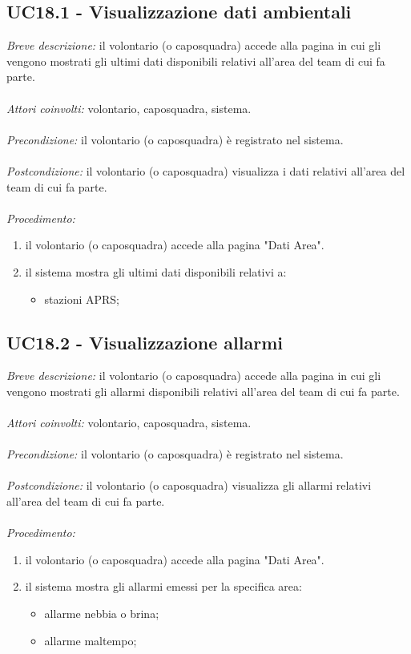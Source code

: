 \subsection{UC18.1 - Visualizzazione dati ambientali}
\textit{Breve descrizione:} il volontario (o caposquadra) accede alla pagina in cui gli vengono mostrati gli ultimi dati disponibili relativi all'area del team di cui fa parte. 
\\
\\
\textit{Attori coinvolti:} volontario, caposquadra, sistema.
\\
\\
\textit{Precondizione:} il volontario (o caposquadra) è registrato nel sistema.
\\
\\
\textit{Postcondizione:} il volontario (o caposquadra) visualizza i dati relativi all'area del team di cui fa parte.
\\
\\
\textit{Procedimento:}
\begin{enumerate}
	\item il volontario (o caposquadra) accede alla pagina "Dati Area".
	\item il sistema mostra gli ultimi dati disponibili relativi a:
	\begin{itemize}
		\item stazioni APRS;
	\end{itemize}
\end{enumerate}

\subsection{UC18.2 - Visualizzazione allarmi}
\textit{Breve descrizione:} il volontario (o caposquadra) accede alla pagina in cui gli vengono mostrati gli allarmi disponibili relativi all'area del team di cui fa parte. 
\\
\\
\textit{Attori coinvolti:} volontario, caposquadra, sistema.
\\
\\
\textit{Precondizione:} il volontario (o caposquadra) è registrato nel sistema.
\\
\\
\textit{Postcondizione:} il volontario (o caposquadra) visualizza gli allarmi relativi all'area del team di cui fa parte.
\\
\\
\textit{Procedimento:}
\begin{enumerate}
	\item il volontario (o caposquadra) accede alla pagina "Dati Area".
	\item il sistema mostra gli allarmi emessi per la specifica area:
	\begin{itemize}
		\item allarme nebbia o brina;
		\item allarme maltempo;
	\end{itemize}
\end{enumerate}

